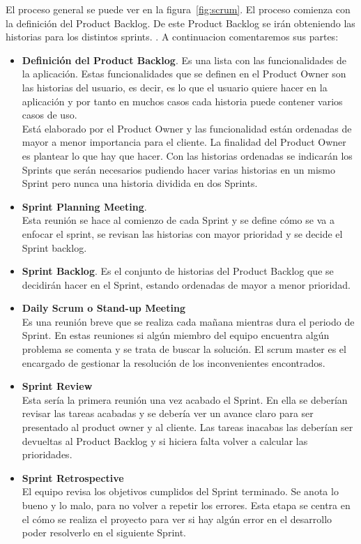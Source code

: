 El proceso general se puede ver en la figura~\ref{fig:scrum}. El proceso comienza con la definición del Product Backlog. De este Product Backlog  se irán obteniendo las historias para los distintos sprints. . A continuacion comentaremos sus partes:
\begin{itemize}
\item \textbf{Definición del Product Backlog}. 
Es una lista con las funcionalidades de la aplicación.
Estas funcionalidades que se definen en el Product Owner son las historias del usuario, es decir, es lo que el usuario quiere hacer en la aplicación y por tanto en muchos casos cada historia puede contener varios casos de uso. \\
Está elaborado por el Product Owner y las funcionalidad están ordenadas de mayor a menor importancia para el cliente. La finalidad del Product Owner es plantear lo que hay que hacer.
Con las historias ordenadas se indicarán los Sprints que serán necesarios pudiendo hacer  varias historias en un mismo Sprint pero nunca una historia dividida en dos Sprints. 

 



\item \textbf{Sprint Planning Meeting}. \\
 Esta reunión se hace al comienzo de cada Sprint y se define cómo se va a enfocar el sprint, se revisan las historias con mayor prioridad y se decide el Sprint backlog.

\item \textbf{Sprint Backlog}. 
Es el conjunto de historias del Product Backlog que se decidirán hacer en el Sprint, estando ordenadas de mayor a menor prioridad. 


 
 
\item \textbf{Daily Scrum o Stand-up Meeting}\\
Es una reunión breve que se realiza cada mañana mientras dura el periodo de Sprint. 
En estas reuniones si algún miembro del equipo encuentra algún problema  se comenta y se trata de buscar la solución. El scrum master es el encargado de gestionar la resolución de los inconvenientes encontrados.



\item\textbf{ Sprint Review}\\
Esta sería la primera reunión una vez acabado el Sprint. En ella se deberían revisar las tareas acabadas y se debería ver un avance claro para ser presentado al product owner y al cliente. Las tareas inacabas las deberían ser devueltas al Product Backlog y si hiciera falta volver a calcular las prioridades.

 \item \textbf{Sprint Retrospective}\\
  El equipo revisa los objetivos cumplidos del Sprint terminado. Se anota lo bueno y lo malo, para no volver a repetir los errores. Esta etapa se centra en el cómo se realiza el proyecto para ver si hay algún error en el desarrollo poder resolverlo en el siguiente Sprint.
\end{itemize}



